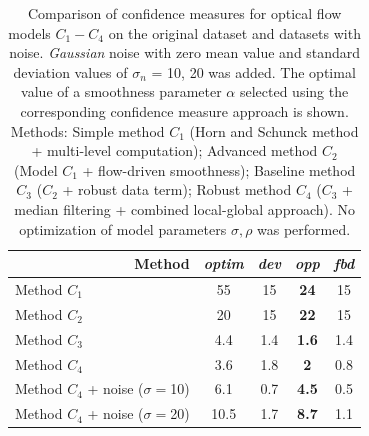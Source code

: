 \begin{table}[ht] \scriptsize
  \centering
  \caption{Comparison of confidence measures for optical flow models $C_1 - C_4$ on the original \rub dataset and datasets with noise. \textit{Gaussian} noise with zero mean value and standard deviation values of $\sigma_n$ = 10, 20 was added. The optimal value of a smoothness parameter $\alpha$ selected using the corresponding confidence measure approach is shown. Methods: Simple method $C_1$ (Horn and Schunck method + multi-level computation); Advanced method $C_2$ (Model $C_1$ + flow-driven smoothness);  Baseline method $C_3$ ($C_2$ + robust data term); Robust method $C_4$ ($C_3$ +  median filtering + combined local-global approach). No optimization of model parameters $\sigma, \rho$ was performed.}
    \begin{tabular}{rcccc}
    \toprule
       Method   & \textit{optim} & \textit{dev} & \textit{opp} & \textit{fbd} \\
    \midrule
    \midrule
    \multicolumn{1}{l}{Method $C_1$} & 55    & 15    & \textbf{24} & 15 \\
    \multicolumn{1}{l}{Method $C_2$} & 20    & 15    & \textbf{22} & 15 \\
    \multicolumn{1}{l}{Method $C_3$} & 4.4   & 1.4   & \textbf{1.6} & 1.4 \\
    \multicolumn{1}{l}{Method $C_4$} & 3.6   & 1.8   & \textbf{2} & 0.8 \\
    \multicolumn{1}{l}{Method $C_4$ + noise ($\sigma=$10)} & 6.1   & 0.7   & \textbf{4.5} & 0.5 \\
    \multicolumn{1}{l}{Method $C_4$ + noise ($\sigma=$20)} & 10.5  & 1.7   & \textbf{8.7} & 1.1 \\
    \bottomrule
    \end{tabular}%
  \label{tab:exp_confidance}%
\end{table}%

